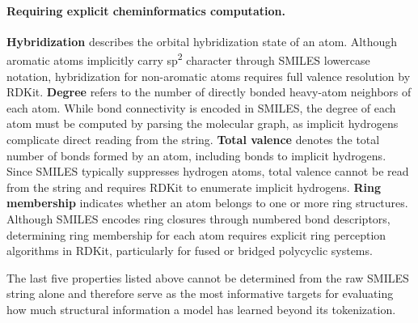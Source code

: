 \paragraph{Requiring explicit cheminformatics computation.}
\textbf{Hybridization} describes the orbital hybridization state of an atom. Although aromatic atoms implicitly carry sp\textsuperscript{2} character through SMILES lowercase notation, hybridization for non-aromatic atoms requires full valence resolution by RDKit.
\textbf{Degree} refers to the number of directly bonded heavy-atom neighbors of each atom. While bond connectivity is encoded in SMILES, the degree of each atom must be computed by parsing the molecular graph, as implicit hydrogens complicate direct reading from the string.
\textbf{Total valence} denotes the total number of bonds formed by an atom, including bonds to implicit hydrogens. Since SMILES typically suppresses hydrogen atoms, total valence cannot be read from the string and requires RDKit to enumerate implicit hydrogens.
\textbf{Ring membership} indicates whether an atom belongs to one or more ring structures. Although SMILES encodes ring closures through numbered bond descriptors, determining ring membership for each atom requires explicit ring perception algorithms in RDKit, particularly for fused or bridged polycyclic systems.

The last five properties listed above cannot be determined from the raw SMILES string alone and therefore serve as the most informative targets for evaluating how much structural information a model has learned beyond its tokenization.